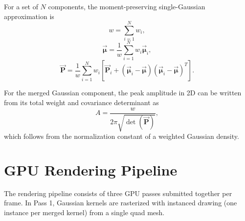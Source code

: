 \documentclass[10pt,conference]{IEEEtran}
\begin{document}
For a set of $N$ components, the moment-preserving single-Gaussian approximation is
\begin{equation}
w = \sum_{i=1}^{N} w_i,
\end{equation}
\begin{equation}
\overrightarrow{\boldsymbol{\mu}} = \frac{1}{w}\sum_{i=1}^{N} w_i\overrightarrow{\boldsymbol{\mu}}_i,
\end{equation}
\begin{equation}
\overrightarrow{\mathbf{P}} = \frac{1}{w}\sum_{i=1}^{N} w_i\left[\overrightarrow{\mathbf{P}}_i + (\overrightarrow{\boldsymbol{\mu}}_i-\overrightarrow{\boldsymbol{\mu}})(\overrightarrow{\boldsymbol{\mu}}_i-\overrightarrow{\boldsymbol{\mu}})^T\right].
\end{equation}

For the merged Gaussian component, the peak amplitude in 2D can be written from its total weight and covariance determinant as
\begin{equation}
A = \frac{w}{2\pi\sqrt{\det(\overrightarrow{\mathbf{P}})}},
\end{equation}
which follows from the normalization constant of a weighted Gaussian density.

\section{GPU Rendering Pipeline}
\label{sec:pipeline}

The rendering pipeline consists of three GPU passes submitted together per frame. In Pass 1, Gaussian kernels are rasterized with instanced drawing (one instance per merged kernel) from a single quad mesh.
\end{document}

